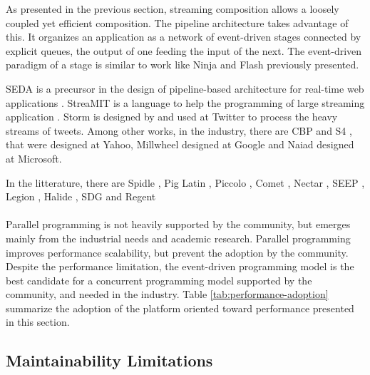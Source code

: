 As presented in the previous section, streaming composition allows a loosely coupled yet efficient composition.
The pipeline architecture takes advantage of this.
It organizes an application as a network of event-driven stages connected by explicit queues, the output of one feeding the input of the next.
The event-driven paradigm of a stage is similar to work like Ninja and Flash \cite{Gribble2001,Pai1999} previously presented.

SEDA is a precursor in the design of pipeline-based architecture for real-time web applications \cite{Welsh2001}.
StreaMIT is a language to help the programming of large streaming application \cite{Thies2002}.
Storm \cite{Toshniwal2014} is designed by and used at Twitter to process the heavy streams of tweets.
Among other works, in the industry, there are
CBP \cite{Logothetis2010} and
S4 \cite{Neumeyer2010}, that were designed at Yahoo,
Millwheel \cite{Akidau2013} designed at Google and
Naiad \cite{Murray2013} designed at Microsoft.

In the litterature, there are
Spidle \cite{Consel2003},
Pig Latin \cite{Olston2008},
Piccolo \cite{Power2010},
Comet \cite{He2010},
Nectar \cite{Gunda2010},
SEEP \cite{Migliavacca2010},
Legion \cite{Bauer2012},
Halide \cite{Ragan-Kelley2013},
SDG \cite{Fernandez2014a} and
Regent \cite{Slaughter2015}


\paragraph{}

Parallel programming is not heavily supported by the community, but emerges mainly from the industrial needs and academic research.
Parallel programming improves performance scalability, but prevent the adoption by the community.
Despite the performance limitation, the event-driven programming model is the best candidate for a concurrent programming model supported by the community, and needed in the industry.
Table \ref{tab:performance-adoption} summarize the adoption of the platform oriented toward performance presented in this section.


\subsection{Maintainability Limitations} \label{chapter3:software-performance:maintainability-limitations}

